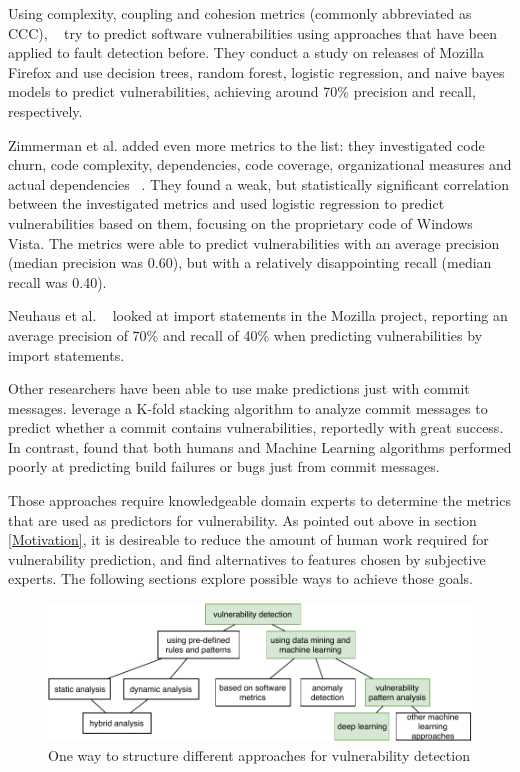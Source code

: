 \documentclass[
	a4paper,
	pagesize,
	pdftex,
	12pt,
	twoside, %
	BCOR=5mm, %
	ngerman,
	fleqn,
	final,
	]{scrartcl}
\begin{document}
Using complexity, coupling and cohesion metrics (commonly abbreviated as CCC), ~\cite{Chowdhury.2011} try to predict software vulnerabilities using approaches that have been applied to fault detection before. They conduct a study on releases of Mozilla Firefox and use decision trees, random forest, logistic regression, and naive bayes models to predict vulnerabilities, achieving around 70\% precision and recall, respectively. 

Zimmerman et al. added even more metrics to the list: they investigated code churn, code complexity, dependencies, code coverage, organizational measures and actual dependencies ~\cite{Zimmermann.2010}. They found a weak, but statistically significant correlation between the investigated metrics and used logistic regression to predict vulnerabilities based on them, focusing on the proprietary code of Windows Vista. The metrics were able to predict vulnerabilities with an average precision (median precision was 0.60), but with a relatively disappointing recall (median recall was 0.40). 

Neuhaus et al. ~\cite{Neuhaus.2007} looked at import statements in the Mozilla project, reporting an average precision of 70\% and recall of 40\% when predicting vulnerabilities by import statements. 

Other researchers have been able to use make predictions just with commit messages. \cite{Zhou.2017} leverage a K-fold stacking algorithm to analyze commit messages to predict whether a commit contains vulnerabilities, reportedly with great success. In contrast, \cite{Russell.2018} found that both humans and Machine Learning algorithms performed poorly at predicting build failures or bugs just from commit messages.

Those approaches require knowledgeable domain experts to determine the metrics that are used as predictors for vulnerability. As pointed out above in section \ref{Motivation}, it is desireable to reduce the amount of human work required for vulnerability prediction, and find alternatives to features chosen by subjective experts. The following sections explore possible ways to achieve those goals.

\begin{figure}[ht]
	\centering
	\includegraphics[width=\linewidth]{img/Overview}
	\caption{One way to structure different approaches for vulnerability detection}
	\label{fig:overview}
\end{figure}
\end{document}
